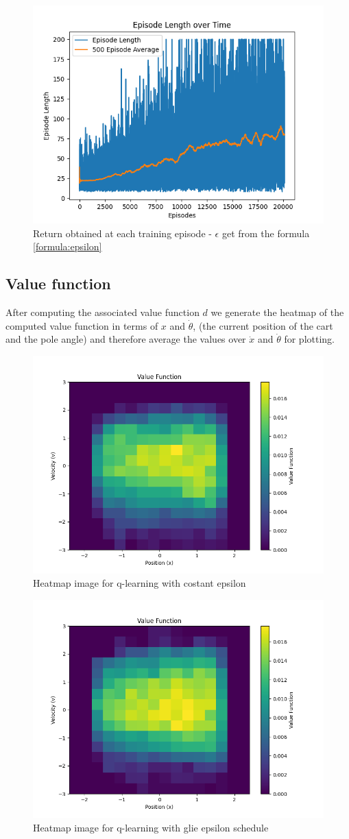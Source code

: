 \documentclass{article}
\begin{document}
\begin{figure}[h]
	\centering
	\includegraphics[width=0.5\linewidth]{../data/plot/q_learning_GLIE.png}
	\caption{Return obtained at each training episode - $\epsilon$ get from the formula \ref{formula:epsilon}}
	\label{fig:glie_eps}
\end{figure}

\subsection{Value function}
After computing the associated value function  $d$ we generate the heatmap of the computed value function in terms of $ x $ and $\dot{\theta}$, (the current position of the cart and the pole angle) and therefore average the values
over $\dot{x} $ and $\dot{\theta} $ for plotting.


\begin{figure}[h]
	\centering
	\includegraphics[width=0.5\linewidth]{../data/plot/heatmap_full_training_constant_0.2.png}
	\caption{Heatmap image for q-learning with costant epsilon}
	\label{fig:plot1}
\end{figure}
\begin{figure}[h]
	\centering
	\includegraphics[width=0.5\linewidth]{../data/plot/heatmap_full_training_GLIE.png}
	\caption{Heatmap image for q-learning with glie epsilon schedule}
	\label{fig:plot1}
\end{figure}
\end{document}
